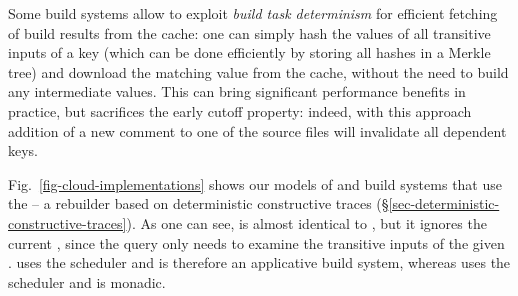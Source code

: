 Some build systems allow to exploit \emph{build task determinism} for efficient
fetching of build results from the cache: one can simply hash the values of all
transitive inputs of a key (which can be done efficiently by storing all hashes
in a Merkle tree) and download the matching value from the cache, without the
need to build any intermediate values. This can bring significant performance
benefits in practice, but sacrifices the early cutoff property: indeed, with
this approach addition of a new comment to one of the source files will
invalidate all dependent keys.

Fig.~\ref{fig-cloud-implementations} shows our models of \Buck and \Nix build
systems that use the  -- a rebuilder based on deterministic
constructive traces (\S\ref{sec-deterministic-constructive-traces}). As one can
see,  is almost identical to , but it ignores
the current , since the  query only needs to examine
the transitive inputs of the given . \Buck uses the 
scheduler and is therefore an applicative build system, whereas \Nix uses the
 scheduler and is monadic.
